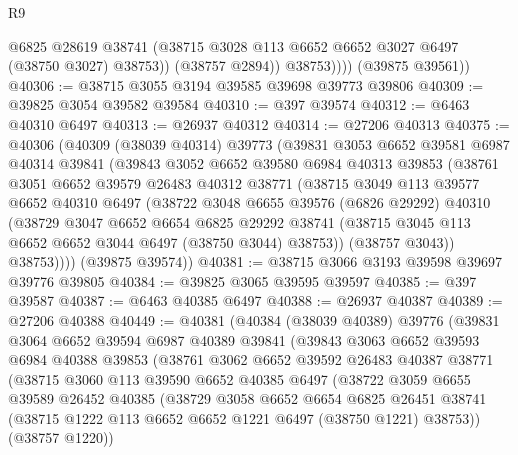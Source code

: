 \begin{lexlean}{R9}
\begin{coremodule}
                  @6825
                  @28619
                  @38741
                  (@38715 @3028 @113 @6652 @6652 @3027 @6497 (@38750 @3027) @38753))
                (@38757 @2894))
              @38753))))
      (@39875 @39561))
@40306 := @38715 @3055 @3194 @39585 @39698 @39773 @39806
@40309 := @39825 @3054 @39582 @39584
@40310 := @397 @39574
@40312 := @6463 @40310 @6497
@40313 := @26937 @40312
@40314 := @27206 @40313
@40375 := @40306
    (@40309
      (@38039 @40314)
      @39773
      (@39831
        @3053
        @6652
        @39581
        @6987
        @40314
        @39841
        (@39843
          @3052
          @6652
          @39580
          @6984
          @40313
          @39853
          (@38761
            @3051
            @6652
            @39579
            @26483
            @40312
            @38771
            (@38715
              @3049
              @113
              @39577
              @6652
              @40310
              @6497
              (@38722
                @3048
                @6655
                @39576
                (@6826 @29292)
                @40310
                (@38729
                  @3047
                  @6652
                  @6654
                  @6825
                  @29292
                  @38741
                  (@38715 @3045 @113 @6652 @6652 @3044 @6497 (@38750 @3044) @38753))
                (@38757 @3043))
              @38753))))
      (@39875 @39574))
@40381 := @38715 @3066 @3193 @39598 @39697 @39776 @39805
@40384 := @39825 @3065 @39595 @39597
@40385 := @397 @39587
@40387 := @6463 @40385 @6497
@40388 := @26937 @40387
@40389 := @27206 @40388
@40449 := @40381
    (@40384
      (@38039 @40389)
      @39776
      (@39831
        @3064
        @6652
        @39594
        @6987
        @40389
        @39841
        (@39843
          @3063
          @6652
          @39593
          @6984
          @40388
          @39853
          (@38761
            @3062
            @6652
            @39592
            @26483
            @40387
            @38771
            (@38715
              @3060
              @113
              @39590
              @6652
              @40385
              @6497
              (@38722
                @3059
                @6655
                @39589
                @26452
                @40385
                (@38729
                  @3058
                  @6652
                  @6654
                  @6825
                  @26451
                  @38741
                  (@38715 @1222 @113 @6652 @6652 @1221 @6497 (@38750 @1221) @38753))
                (@38757 @1220))

\end{coremodule}
\end{lexlean}
